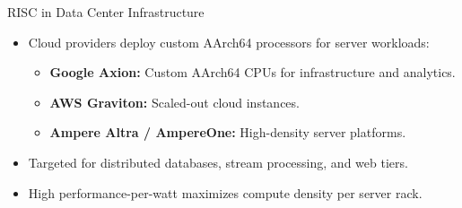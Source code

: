 \documentclass[aspectratio=169,11pt,t]{beamer}
\newcommand{\key}[1]{\textbf{#1}}
\begin{document}
\begin{frame}{RISC in Data Center Infrastructure}
\large
\begin{itemize}\setlength{\itemsep}{8pt}
  \item Cloud providers deploy custom AArch64 processors for server workloads:
  \begin{itemize}\setlength{\itemsep}{4pt}
    \item \key{Google Axion:} Custom AArch64 CPUs for infrastructure and analytics.
    \item \key{AWS Graviton:} Scaled-out cloud instances.
    \item \key{Ampere Altra / AmpereOne:} High-density server platforms.
  \end{itemize}
  \item Targeted for distributed databases, stream processing, and web tiers.
  \item High performance-per-watt maximizes compute density per server rack.
\end{itemize}
\end{frame}

\end{document}
